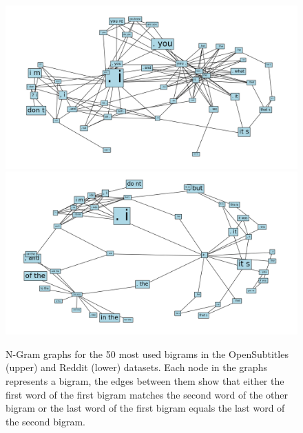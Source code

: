\begin{figure}[htb]
	\includegraphics[width=\linewidth]{img/opensubtitles_bigram_top_50_graph}
	\centering
	\small
	\endminipage\hfill
	\includegraphics[width=\linewidth]{img/reddit_bigram_top_50_graph}
	\centering
	\small
	\endminipage\hfill
	\caption{N-Gram graphs for the 50 most used bigrams in the OpenSubtitles (upper) and Reddit (lower) datasets. Each node in the graphs represents a bigram, the edges between them show that either the first word of the first bigram matches the second word of the other bigram or the last word of the first bigram equals the last word of the second bigram.}
	\label{data:ngram:graph_top_50}
\end{figure}

